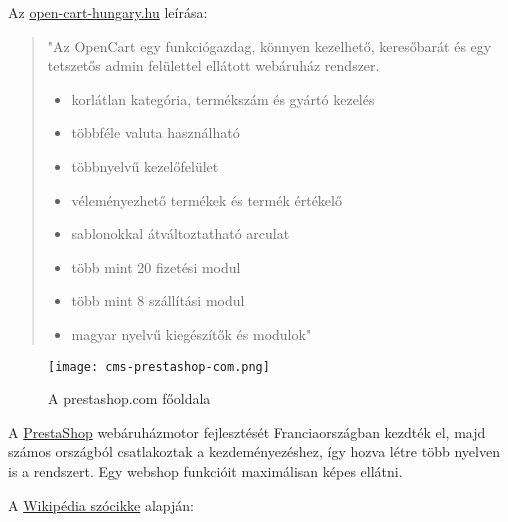 Az \href{http://www.opencart-hungary.hu/}{open-cart-hungary.hu} leírása:

\begin{quote}
"Az OpenCart egy funkciógazdag, könnyen kezelhető, keresőbarát és egy tetszetős admin felülettel ellátott webáruház rendszer.

\begin{itemize}
	\item korlátlan kategória, termékszám és gyártó kezelés
	\item többféle valuta használható
	\item többnyelvű kezelőfelület
	\item véleményezhető termékek és termék értékelő
	\item sablonokkal átváltoztatható arculat
	\item több mint 20 fizetési modul
	\item több mint 8 szállítási modul
	\item magyar nyelvű kiegészítők és modulok"
\end{itemize}
\end{quote}

\newpage


\begin{figure}
	\texttt{[image: cms-prestashop-com.png]}
	\caption{A prestashop.com főoldala}
\end{figure}

A \href{http://www.prestashop.com/}{PrestaShop} webáruházmotor fejlesztését Franciaországban kezdték el, majd számos országból csatlakoztak a kezdeményezéshez, így hozva létre több nyelven is a rendszert. Egy webshop funkcióit maximálisan képes ellátni.

A \href{https://hu.wikipedia.org/wiki/PrestaShop}{Wikipédia szócikke} alapján:


